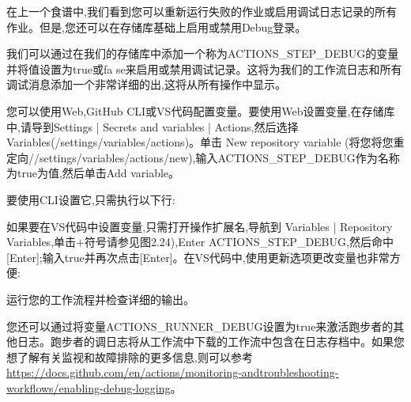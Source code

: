
在上一个食谱中,我们看到您可以重新运行失败的作业或启用调试日志记录的所有作业。但是,您还可以在存储库基础上启用或禁用Debug登录。


我们可以通过在我们的存储库中添加一个称为ACTIONS\_STEP\_DEBUG的变量并将值设置为true或fa se来启用或禁用调试记录。这将为我们的工作流日志和所有调试消息添加一个非常详细的出,这将从所有操作中显示。

您可以使用Web,GitHub CLI或VS代码配置变量。要使用Web设置变量,在存储库中,请导到Settings | Secrets and variables | Actions,然后选择Variables(/settings/variables/actions)。单击 New repository variable (将您将您重定向//settings/variables/actions/new),输入ACTIONS\_STEP\_DEBUG作为名称为true为值,然后单击Add variable。

要使用CLI设置它,只需执行以下行:


如果要在VS代码中设置变量,只需打开操作扩展名,导航到 Variables |
Repository Variables,单击+符号请参见图2.24),Enter ACTIONS\_STEP\_DEBUG,然后命中[Enter];输入true并再次点击[Enter]。在VS代码中,使用更新选项更改变量也非常方便:


运行您的工作流程并检查详细的输出。


您还可以通过将变量ACTIONS\_RUNNER\_DEBUG设置为true来激活跑步者的其他日志。跑步者的调日志将从工作流中下载的工作流中包含在日志存档中。如果您想了解有关监视和故障排除的更多信息,则可以参考\url{https://docs.github.com/en/actions/monitoring-andtroubleshooting-workflows/enabling-debug-logging}。